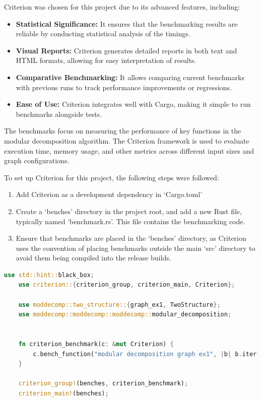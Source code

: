 Criterion was chosen for this project due to its advanced features, including:
\begin{itemize}
    \item \textbf{Statistical Significance:} It ensures that the benchmarking results are reliable by conducting statistical analysis of the timings.
    \item \textbf{Visual Reports:} Criterion generates detailed reports in both text and HTML formats, allowing for easy interpretation of results.
    \item \textbf{Comparative Benchmarking:} It allows comparing current benchmarks with previous runs to track performance improvements or regressions.
    \item \textbf{Ease of Use:} Criterion integrates well with Cargo, making it simple to run benchmarks alongside tests.
\end{itemize}

The benchmarks focus on measuring the performance of key functions in the modular decomposition algorithm.
The Criterion framework is used to evaluate execution time, memory usage, and other metrics across different input sizes and graph configurations.

To set up Criterion for this project, the following steps were followed:
\begin{enumerate}
    \item Add Criterion as a development dependency in `Cargo.toml'
    \item  Create a `benches' directory in the project root, and add a new Rust file, typically named `benchmark.rs'.
    This file contains the benchmarking code.
    \item Ensure that benchmarks are placed in the `benches' directory, as Criterion uses the convention of placing benchmarks outside the main `src' directory to avoid them being compiled into the release builds.
\end{enumerate}

\begin{myex}

\end{myex}

\begin{lstlisting}[language=Rust, style=rust, caption={Example of benchmark code for modular decomposition}, label={lst:rust-example-of-benchmark-code}, firstnumber=1]
    use std::hint::black_box;
    use criterion::{criterion_group, criterion_main, Criterion};

    use moddecomp::two_structure::{graph_ex1, TwoStructure};
    use moddecomp::moddecomp::moddecomp::modular_decomposition;


    fn criterion_benchmark(c: &mut Criterion) {
        c.bench_function("modular decomposition graph ex1", |b| b.iter(|| modular_decomposition(black_box(&mut graph_ex1()), black_box(None))));
    }

    criterion_group!(benches, criterion_benchmark);
    criterion_main!(benches);
\end{lstlisting}

